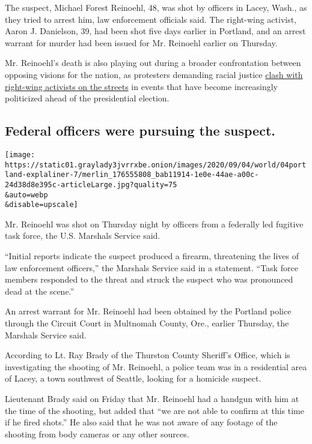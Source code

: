 The suspect, Michael Forest Reinoehl, 48, was shot by officers in Lacey,
Wash., as they tried to arrest him, law enforcement officials said. The
right-wing activist, Aaron J. Danielson, 39, had been shot five days
earlier in Portland, and an arrest warrant for murder had been issued
for Mr. Reinoehl earlier on Thursday.

Mr. Reinoehl's death is also playing out during a broader confrontation
between opposing visions for the nation, as protesters demanding racial
justice
\href{https://www.nytimes3xbfgragh.onion/2020/09/01/us/portland-kenosha-protests-clashes.html?action=click\&module=RelatedLinks\&pgtype=Article}{clash
with right-wing activists on the streets} in events that have become
increasingly politicized ahead of the presidential election.

\hypertarget{federal-officers-were-pursuing-the-suspect}{%
\subsection{Federal officers were pursuing the
suspect.}\label{federal-officers-were-pursuing-the-suspect}}

\texttt{[image: https://static01.graylady3jvrrxbe.onion/images/2020/09/04/world/04portland-explaliner-7/merlin\_176555808\_bab11914-1e0e-44ae-a00c-24d38d8e395c-articleLarge.jpg?quality=75\\\&auto=webp\\\&disable=upscale]}

Mr. Reinoehl was shot on Thursday night by officers from a federally led
fugitive task force, the U.S. Marshals Service said.

``Initial reports indicate the suspect produced a firearm, threatening
the lives of law enforcement officers,'' the Marshals Service said in a
statement. ``Task force members responded to the threat and struck the
suspect who was pronounced dead at the scene.''

An arrest warrant for Mr. Reinoehl had been obtained by the Portland
police through the Circuit Court in Multnomah County, Ore., earlier
Thursday, the Marshals Service said.

According to Lt. Ray Brady of the Thurston County Sheriff's Office,
which is investigating the shooting of Mr. Reinoehl, a police team was
in a residential area of Lacey, a town southwest of Seattle, looking for
a homicide suspect.

Lieutenant Brady said on Friday that Mr. Reinoehl had a handgun with him
at the time of the shooting, but added that ``we are not able to confirm
at this time if he fired shots.'' He also said that he was not aware of
any footage of the shooting from body cameras or any other sources.

